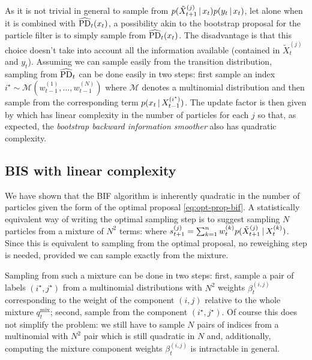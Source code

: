 As it is not trivial in general to sample from $p(\tilde X^{(j)}_{t+1}\,|\, x_{t})p(y_{t}\,|\, x_{t})$, let alone when it is combined with $\widehat{\text{PD}}_{t}(x_{t})$, a possibility akin to the bootstrap proposal for the particle filter is to simply sample from $\widehat{\text{PD}}_{t}(x_{t})$. The disadvantage is that this choice doesn't take into account all the information available (contained in $\tilde X^{(j)}_{t}$ and $y_{t}$). Assuming we can sample easily from the transition distribution, sampling from $\widehat{\text{PD}}_{t}$ can be done easily in two steps: first sample an index $i^{\star}\sim \mathcal M(w^{(1)}_{t-1}, \dots, w^{(N)}_{t-1})$ where $\mathcal M$ denotes a multinomial distribution and then sample from the corresponding term $p(x_{t}\,|\, X^{(i^{\star})}_{t-1})$. The update factor is then given by
%
%
which has linear complexity in the number of particles for each $j$ so that, as expected, the \emph{bootstrap backward information smoother} also has quadratic complexity.

\subsection{BIS with linear complexity}
%
We have shown that the BIF algorithm is inherently quadratic in the number of particles given the form of the optimal proposal \eqref{eq:opt-prop-bif}. A statistically equivalent way of writing the optimal sampling step is to suggest sampling $N$ particles from a mixture of $N^{2}$ terms: 
%
where $s^{(j)}_{t+1}=\sum_{k=1}^{n}w^{(k)}_{t}p(\tilde X^{(j)}_{t+1}\,|\, X^{(k)}_{t})$. Since this is equivalent to sampling from the optimal proposal, no reweighing step is needed, provided we can sample exactly from the mixture.
 
Sampling from such a mixture can be done in two steps: first, sample a pair of labels $(i^{\star},j^{\star})$ from a multinomial distributions with $N^{2}$ weights $\beta^{(i,j)}_{t}$ corresponding to the weight of the component $(i,j)$ relative to the whole mixture $q_{t}^{\text{mix}}$; second, sample from the component $(i^{\star},j^{\star})$. 
Of course this does not simplify the problem: we still have to sample $N$ pairs of indices from a multinomial with $N^{2}$ pair which is still quadratic in $N$ and, additionally, computing the mixture component weights $\beta^{(i,j)}_{t}$ is intractable in general. 

